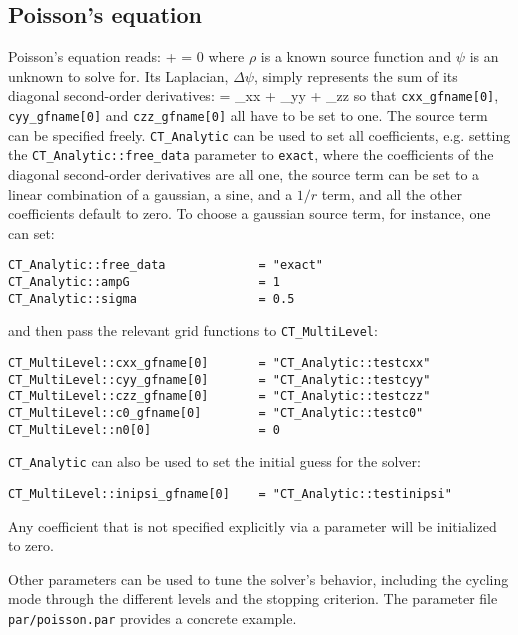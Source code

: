 \subsection{Poisson's equation}
Poisson's equation reads:
\beq
\Delta \psi + \rho = 0
\eeq
where $\rho$ is a known source function and $\psi$ is an unknown
to solve for. Its Laplacian, $\Delta \psi$, simply represents the
sum of its diagonal second-order derivatives:
\beq
\Delta \psi = \partial_{xx} \psi + \partial_{yy} \psi + \partial_{zz} \psi
\eeq
so that \texttt{cxx\_gfname[0]}, \texttt{cyy\_gfname[0]} and \texttt{czz\_gfname[0]}
all have to be set to one. The source term can be specified freely.
\texttt{CT\_Analytic} can be used to set all coefficients, e.g. 
setting the \texttt{CT\_Analytic::free\_data} parameter to \texttt{exact}, 
where the coefficients of the diagonal second-order derivatives are
all one, the source term can be set to a linear combination of a
gaussian, a sine, and a $1/r$ term, and all the other coefficients
default to zero. To choose a gaussian source term, for instance, one
can set:
\begin{verbatim}
CT_Analytic::free_data             = "exact"
CT_Analytic::ampG                  = 1
CT_Analytic::sigma                 = 0.5
\end{verbatim}
and then pass the relevant grid functions to \texttt{CT\_MultiLevel}:
\begin{verbatim}
CT_MultiLevel::cxx_gfname[0]       = "CT_Analytic::testcxx"
CT_MultiLevel::cyy_gfname[0]       = "CT_Analytic::testcyy"
CT_MultiLevel::czz_gfname[0]       = "CT_Analytic::testczz"
CT_MultiLevel::c0_gfname[0]        = "CT_Analytic::testc0"
CT_MultiLevel::n0[0]               = 0
\end{verbatim}
\texttt{CT\_Analytic} can also be used to set the initial guess for
the solver:
\begin{verbatim}
CT_MultiLevel::inipsi_gfname[0]    = "CT_Analytic::testinipsi"
\end{verbatim}
Any coefficient that is not specified explicitly via a parameter 
will be initialized to zero.

Other parameters can be used to tune the solver's behavior, 
including the cycling mode through the different levels and the
stopping criterion. The parameter file \texttt{par/poisson.par}
provides a concrete example.

